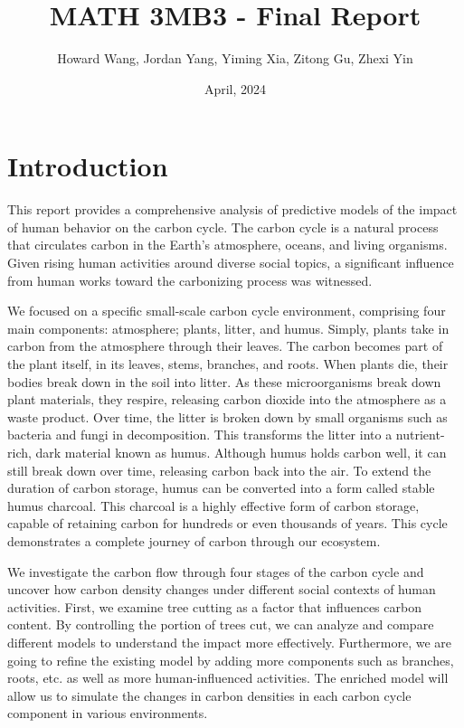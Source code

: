\documentclass[a4paper]{article}
\title{MATH 3MB3 - Final Report}
\author{Howard Wang, Jordan Yang, Yiming Xia, Zitong Gu, Zhexi Yin}
\date{April, 2024}
\begin{document}
\maketitle

\section{Introduction}

This report provides a comprehensive analysis of predictive models of the impact of human behavior on the carbon cycle. The carbon cycle is a natural process that circulates carbon in the Earth’s atmosphere, oceans, and living organisms. Given rising human activities around diverse social topics, a significant influence from human works toward the carbonizing process was witnessed.

We focused on a specific small-scale carbon cycle environment, comprising four main components: atmosphere; plants, litter, and humus. Simply, plants take in carbon from the atmosphere through their leaves. The carbon becomes part of the plant itself, in its leaves, stems, branches, and roots. When plants die, their bodies break down in the soil into litter. As these microorganisms break down plant materials, they respire,  releasing carbon dioxide into the atmosphere as a waste product. Over time, the litter is broken down by small organisms such as bacteria and fungi in decomposition. This transforms the litter into a nutrient-rich, dark material known as humus. Although humus holds carbon well, it can still break down over time, releasing carbon back into the air. To extend the duration of carbon storage, humus can be converted into a form called stable humus charcoal. This charcoal is a highly effective form of carbon storage, capable of retaining carbon for hundreds or even thousands of years. This cycle demonstrates a complete journey of carbon through our ecosystem.

We investigate the carbon flow through four stages of the carbon cycle and uncover how carbon density changes under different social contexts of human activities. First, we examine tree cutting as a factor that influences carbon content. By controlling the portion of trees cut, we can analyze and compare different models to understand the impact more effectively. Furthermore, we are going to refine the existing model by adding more components such as branches, roots, etc. as well as more human-influenced activities. The enriched model will allow us to simulate the changes in carbon densities in each carbon cycle component in various environments.
\end{document}
